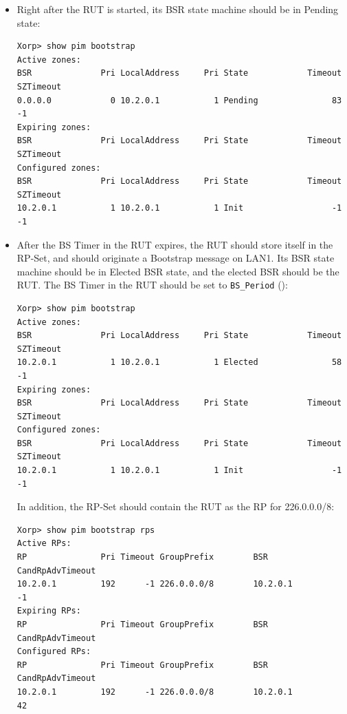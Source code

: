 \documentclass[11pt]{report}
\begin{document}

\begin{itemize}

  \item Right after the RUT is started, its BSR state machine should be in
  Pending state:

\begin{verbatim}
Xorp> show pim bootstrap 
Active zones:
BSR              Pri LocalAddress     Pri State            Timeout SZTimeout
0.0.0.0            0 10.2.0.1           1 Pending               83        -1
Expiring zones:
BSR              Pri LocalAddress     Pri State            Timeout SZTimeout
Configured zones:
BSR              Pri LocalAddress     Pri State            Timeout SZTimeout
10.2.0.1           1 10.2.0.1           1 Init                  -1        -1
\end{verbatim}

  \item After the BS Timer in the RUT expires, the RUT should store itself in
        the RP-Set, and should originate a Bootstrap message on LAN1.
        Its BSR state machine should be in Elected BSR state, and the elected
        BSR should be the RUT.
        The BS Timer in the RUT should be set to \verb=BS_Period=
        ({\PimsmBSPeriod}):

\begin{verbatim}
Xorp> show pim bootstrap 
Active zones:
BSR              Pri LocalAddress     Pri State            Timeout SZTimeout
10.2.0.1           1 10.2.0.1           1 Elected               58        -1
Expiring zones:
BSR              Pri LocalAddress     Pri State            Timeout SZTimeout
Configured zones:
BSR              Pri LocalAddress     Pri State            Timeout SZTimeout
10.2.0.1           1 10.2.0.1           1 Init                  -1        -1
\end{verbatim}

  In addition, the RP-Set should contain the RUT as the RP for 226.0.0.0/8:

\begin{verbatim}
Xorp> show pim bootstrap rps 
Active RPs:
RP               Pri Timeout GroupPrefix        BSR         CandRpAdvTimeout
10.2.0.1         192      -1 226.0.0.0/8        10.2.0.1                  -1
Expiring RPs:
RP               Pri Timeout GroupPrefix        BSR         CandRpAdvTimeout
Configured RPs:
RP               Pri Timeout GroupPrefix        BSR         CandRpAdvTimeout
10.2.0.1         192      -1 226.0.0.0/8        10.2.0.1                  42
\end{verbatim}

\end{itemize}
\end{document}

